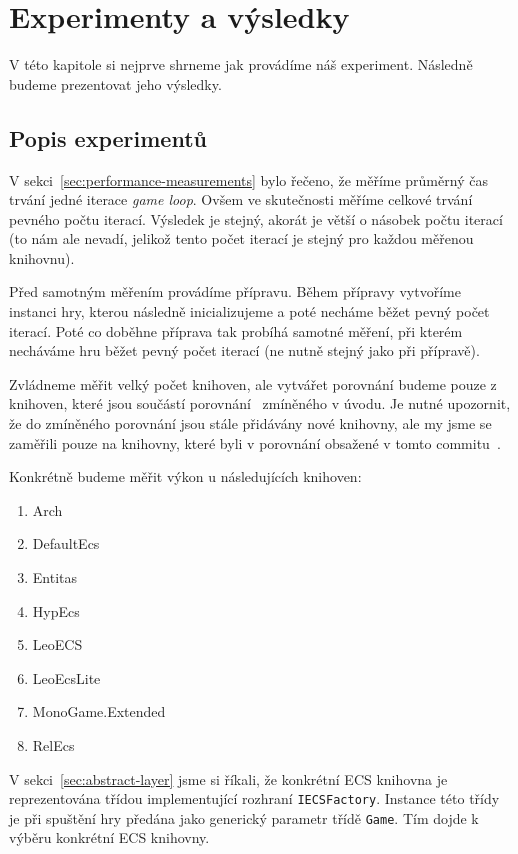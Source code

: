 \chapter{Experimenty a výsledky}
V této kapitole si nejprve shrneme jak provádíme náš experiment. Následně budeme prezentovat jeho výsledky.

\section{Popis experimentů}
V sekci~\ref{sec:performance-measurements} bylo řečeno, že měříme průměrný čas trvání jedné iterace \textit{game loop}. Ovšem ve skutečnosti měříme celkové trvání pevného počtu iterací. Výsledek je stejný, akorát je větší o násobek počtu iterací (to nám ale nevadí, jelikož tento počet iterací je stejný pro každou měřenou knihovnu).

Před samotným měřením provádíme přípravu. Během přípravy vytvoříme instanci hry, kterou následně inicializujeme a poté necháme běžet pevný počet iterací. Poté co doběhne příprava tak probíhá samotné měření, při kterém  necháváme hru běžet pevný počet iterací (ne nutně stejný jako při přípravě).

Zvládneme měřit velký počet knihoven, ale vytvářet porovnání budeme pouze z knihoven, které jsou součástí porovnání~\cite{EcsCsharpBenchmark} zmíněného v úvodu. Je nutné upozornit, že do zmíněného porovnání jsou stále přidávány nové knihovny, ale my jsme se zaměřili pouze na knihovny, které byli v porovnání obsažené v tomto commitu~\cite{EcsCsharpBenchmarkCommit}.


Konkrétně budeme měřit výkon u následujících knihoven:

\begin{enumerate}
    \item Arch~\cite{Arch}
    \item DefaultEcs~\cite{DefaultEcs}
    \item Entitas~\cite{Entitas}
    \item HypEcs~\cite{HypEcs}
    \item LeoECS~\cite{LeoECS}
    \item LeoEcsLite~\cite{LeoEcsLite}
    \item MonoGame.Extended~\cite{MonoGameExtended}
    \item RelEcs~\cite{RelEcs}
\end{enumerate}

V sekci~\ref{sec:abstract-layer} jsme si říkali, že konkrétní ECS knihovna je reprezentována třídou implementující rozhraní \texttt{IECSFactory}. Instance této třídy je při spuštění hry předána jako generický parametr třídě \texttt{Game}. Tím dojde k výběru konkrétní ECS knihovny.

